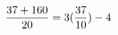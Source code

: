 \documentclass[preview]{standalone}
\begin{document}
\begin{align*}
\special{dvisvgm:raw <g id='unique000'>}\frac{37 + 160}{20} = 3(\frac{37}{10}) - 4\special{dvisvgm:raw </g>}
\end{align*}
\end{document}
